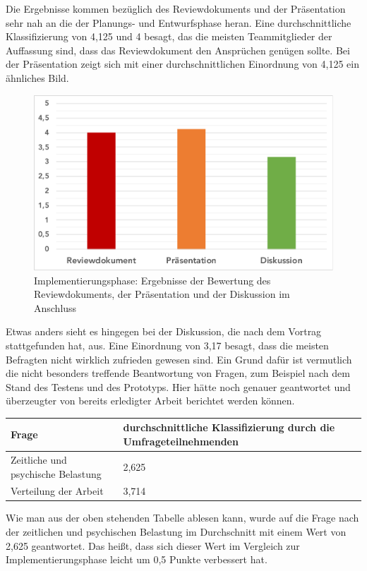 \documentclass[../review_3.tex]{subfiles}
\begin{document}
Die Ergebnisse kommen bezüglich des Reviewdokuments und der Präsentation sehr nah an die der Planungs- und Entwurfsphase heran. Eine durchschnittliche Klassifizierung von 4,125 und 4 besagt, das die meisten Teammitglieder der Auffassung sind, dass das Reviewdokument den Ansprüchen genügen sollte. Bei der Präsentation zeigt sich mit einer durchschnittlichen Einordnung von 4,125 ein ähnliches Bild.
\begin{figure} [h]
    \centering
    \includegraphics[width = 0.7\linewidth]{img/umfrageimplement.pdf}
    \caption{Implementierungsphase: Ergebnisse der Bewertung des Reviewdokuments, der Präsentation und der Diskussion im Anschluss}
    \label{implement}
\end{figure}
Etwas anders sieht es hingegen bei der Diskussion, die nach dem Vortrag stattgefunden hat, aus. Eine Einordnung von 3,17 besagt, dass die meisten Befragten nicht wirklich zufrieden gewesen sind. Ein Grund dafür ist vermutlich die nicht besonders treffende Beantwortung von Fragen, zum Beispiel nach dem Stand des Testens und des Prototyps. Hier hätte noch genauer geantwortet und überzeugter von bereits erledigter Arbeit berichtet werden können.

\begin{longtable}[H]{p{} p{}}
    \toprule
    \textbf{Frage}                     & \textbf{durchschnittliche Klassifizierung durch die Umfrageteilnehmenden} \\ \midrule \endhead
    Zeitliche und psychische Belastung & 2,625                                                                     \\
    Verteilung der Arbeit              & 3,714                                                                       \\ \bottomrule
\end{longtable}

Wie man aus der oben stehenden Tabelle ablesen kann, wurde auf die Frage nach der zeitlichen und psychischen Belastung im Durchschnitt mit einem Wert von 2,625 geantwortet. Das heißt, dass sich dieser Wert im Vergleich zur Implementierungsphase leicht um 0,5 Punkte verbessert hat.
\end{document}
